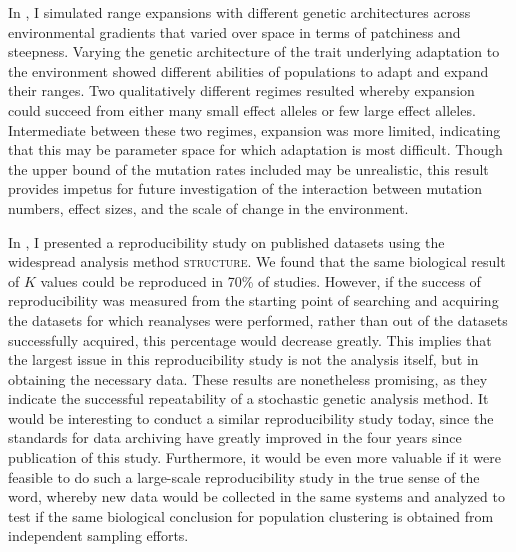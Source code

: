 In , I simulated range expansions with different genetic architectures across environmental gradients that varied over space in terms of patchiness and steepness. Varying the genetic architecture of the trait underlying adaptation to the environment showed different abilities of populations to adapt and expand their ranges. Two qualitatively different regimes resulted whereby expansion could succeed from either many small effect alleles or few large effect alleles. Intermediate between these two regimes, expansion was more limited, indicating that this may be parameter space for which adaptation is most difficult. Though the upper bound of the mutation rates included may be unrealistic, this result provides impetus for future investigation of the interaction between mutation numbers, effect sizes, and the scale of change in the environment.

In , I presented a reproducibility study on published datasets using the widespread analysis method \textsc{structure}. We found that the same biological result of $K$ values could be reproduced in 70\% of studies. However, if the success of reproducibility was measured from the starting point of searching and acquiring the datasets for which reanalyses were performed, rather than out of the datasets successfully acquired, this percentage would decrease greatly. This implies that the largest issue in this reproducibility study is not the analysis itself, but in obtaining the necessary data. These results are nonetheless promising, as they indicate the successful repeatability of a stochastic genetic analysis method. It would be interesting to conduct a similar reproducibility study today, since the standards for data archiving have greatly improved in the four years since publication of this study. Furthermore, it would be even more valuable if it were feasible to do such a large-scale reproducibility study in the true sense of the word, whereby new data would be collected in the same systems and analyzed to test if the same biological conclusion for population clustering is obtained from independent sampling efforts.




